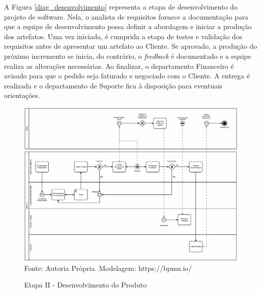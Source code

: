 \documentclass[	DIV=calc,%
							paper=a4,%
							fontsize=12pt,%
							onecolumn]{scrartcl}	 					%
\begin{document}
A Figura \ref{diag_desenvolvimento} representa a etapa de desenvolvimento do projeto de software. Nela, o analista de requisitos fornece a documentação para que a equipe de desenvolvimento possa definir a abordagem e iniciar a produção dos artefatos. Uma vez iniciada, é cumprida a etapa de testes e validação dos requisitos antes de apresentar um artefato ao Cliente. Se aprovado, a produção do próximo incremento se inicia, do contrário, o \textit{feedback} é documentado e a equipe realiza as alterações necessárias. Ao finalizar, o departamento Financeiro é avisado para que o pedido seja faturado e negociado com o Cliente. A entrega é realizada e o departamento de Suporte fica à disposição para eventuais orientações.

\begin{figure}
	\caption{Etapa II - Desenvolvimento do Produto}
	\centering
	\includegraphics[width=\textwidth]{Desenvolvimento}
	{Fonte: Autoria Própria. Modelagem: https://bpmn.io/}
\end{figure}\label{diag_desenvolvimento}


\renewcommand\refname{} %

  
\end{document}
